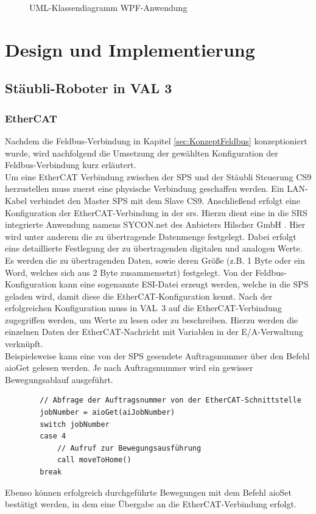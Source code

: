 \documentclass[ a4paper,
                oneside,
                toc=bibliography,
                toc=listof
                ]{scrbook}
\begin{document}
\begin{figure}
		\caption{UML-Klassendiagramm WPF-Anwendung}
		\label{fig:UMLKlassenWPF}
	\end{figure}
	
	\chapter{Design und Implementierung}
	\section{Stäubli-Roboter in VAL 3}
	
	\subsection{EtherCAT}
	Nachdem die Feldbus-Verbindung in Kapitel \ref{sec:KonzeptFeldbus} konzeptioniert wurde, wird nachfolgend die Umsetzung der gewählten Konfiguration der Feldbus-Verbindung kurz erläutert.\\
	Um eine EtherCAT Verbindung zwischen der SPS und der Stäubli Steuerung CS9 herzustellen muss zuerst eine physische Verbindung geschaffen werden. Ein LAN-Kabel verbindet den Master SPS mit dem Slave CS9. Anschließend erfolgt eine Konfiguration der EtherCAT-Verbindung in der \acl{srs}. Hierzu dient eine in die SRS integrierte Anwendung namens \glqq SYCON.net \grqq{} des Anbieters \glqq Hilscher GmbH \grqq. Hier wird unter anderem die zu übertragende Datenmenge festgelegt. Dabei erfolgt eine detaillierte Festlegung der zu übertragenden digitalen und analogen Werte. Es werden die zu übertragenden Daten, sowie deren Größe (z.B. 1 Byte oder ein Word, welches sich aus 2 Byte zusammensetzt) festgelegt. Von der Feldbus-Konfiguration kann eine sogenannte ESI-Datei erzeugt werden, welche in die SPS geladen wird, damit diese die EtherCAT-Konfiguration kennt. Nach der erfolgreichen Konfiguration muss in VAL~3 auf die EtherCAT-Verbindung zugegriffen werden, um Werte zu lesen oder zu beschreiben. Hierzu werden die einzelnen Daten der EtherCAT-Nachricht mit Variablen in der E/A-Verwaltung verknüpft. \cite{CS9} \cite{CS9_Fieldbus}\\
	Beispielsweise kann eine von der SPS gesendete Auftragsnummer über den Befehl \glqq aioGet\grqq{} gelesen werden. Je nach Auftragsnummer wird ein gewisser Bewegungsablauf ausgeführt.
	\begin{lstlisting}
		// Abfrage der Auftragsnummer von der EtherCAT-Schnittstelle
		jobNumber = aioGet(aiJobNumber)
		switch jobNumber
		case 4
			// Aufruf zur Bewegungsausführung
			call moveToHome()
		break
	\end{lstlisting}
	Ebenso können erfolgreich durchgeführte Bewegungen mit dem Befehl \glqq aioSet\grqq{} bestätigt werden, in dem eine Übergabe an die EtherCAT-Verbindung erfolgt. \cite{VAL3} 
	
\end{document}
